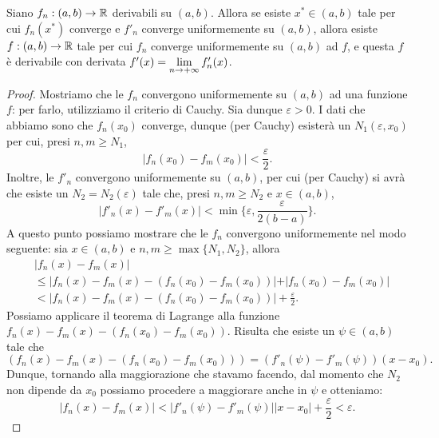 \documentclass[Completo.tex]{subfiles}
\begin{document}
\begin{eTh}
	Siano $f_n: (a,b) \ra \bb[R]$ derivabili su $(a,b)$. Allora se esiste $x^{*} \in (a,b)$ tale per cui $f_n(x^{*})$ converge e $f'_n$ converge uniformemente su $(a,b)$, allora esiste $f: (a,b) \ra \bb[R]$ tale per cui $f_n$ converge uniformemente su $(a,b)$ ad $f$, e questa $f$ è derivabile con derivata $f'(x) = \lim\limits_{n \rightarrow +\infty} f'_n(x)$.
\end{eTh}
\begin{proof}
	Mostriamo che le $f_n$ convergono uniformemente su $(a,b)$ ad una funzione $f$: per farlo, utilizziamo il criterio di Cauchy. Sia dunque $\varepsilon > 0$. I dati che abbiamo sono che $f_n(x_0)$ converge, dunque (per Cauchy) esisterà un $N_1(\varepsilon, x_0)$ per cui, presi $n, m \geq N_1$,
	\begin{equation*}
	\vert f_n(x_0) - f_m(x_0) \vert < \frac{\varepsilon}{2}.
	\end{equation*}
	Inoltre, le $f'_n$ convergono uniformemente su $(a,b)$, per cui (per Cauchy) si avrà che esiste un $N_2 = N_2(\varepsilon)$ tale che, presi $n, m \geq N_2$ e $x \in (a,b)$,
	\begin{equation*}
	\vert f'_n(x) - f'_m(x) \vert < \min\{\varepsilon, \frac{\varepsilon}{2(b-a)}\}.
	\end{equation*}
	A questo punto possiamo mostrare che le $f_n$ convergono uniformemente nel modo seguente: sia $x \in (a,b)$ e $n, m \geq \max\{N_1, N_2\}$, allora
	\begin{align*}
	&\vert f_n(x) - f_m(x) \vert\\
	& \leq \vert f_n(x) - f_m(x) - (f_n(x_0) - f_m(x_0)) \vert + \vert f_n(x_0) - f_m(x_0) \vert\\
	&< \vert f_n(x) - f_m(x) - (f_n(x_0) - f_m(x_0))\vert + \frac{\varepsilon}{2}.
	\end{align*}
	Possiamo applicare il teorema di Lagrange alla funzione $f_n(x) - f_m(x) - (f_n(x_0)-f_m(x_0))$. Risulta che esiste un $\psi \in (a,b)$ tale che
	\begin{equation*}
	(f_n(x) - f_m(x) - (f_n(x_0)-f_m(x_0))) = (f'_n(\psi) - f'_m(\psi))(x-x_0).
	\end{equation*}
	Dunque, tornando alla maggiorazione che stavamo facendo, dal momento che $N_2$ non dipende da $x_0$ possiamo procedere a maggiorare anche in $\psi$ e otteniamo:
	\begin{equation*}
	\vert f_n(x) - f_m(x) \vert < \vert f'_n(\psi) - f'_m(\psi) \vert \vert x - x_0 \vert + \frac{\varepsilon}{2} < \varepsilon.
	\end{equation*}

\end{proof}
\end{document}
